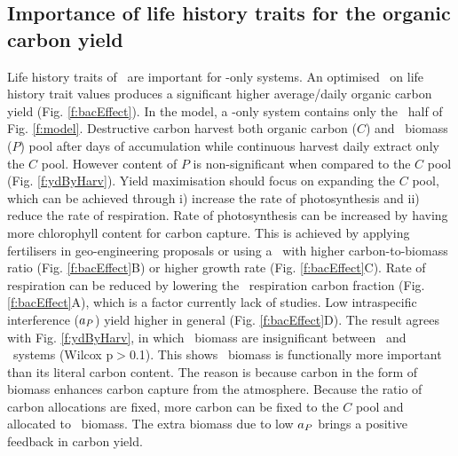 \documentclass[../thesis.tex]{subfiles} %
\begin{document}
\subsection{Importance of life history traits for the organic carbon yield}
Life history traits of \phy\ are important for \phy-only systems. An optimised \phy\ on life history trait values produces a significant higher average/daily organic carbon yield (Fig. \ref{f:bacEffect}).  In the model, a \phy-only system contains only the \phy\ half of Fig. \ref{f:model}.  Destructive carbon harvest both organic carbon ($C$) and \phy\ biomass ($P$) pool after days of accumulation while continuous harvest daily extract only the $C$ pool.  However content of $P$ is non-significant when compared to the $C$ pool (Fig. \ref{f:ydByHarv}).  Yield maximisation should focus on expanding the $C$ pool, which can be achieved through \Rn{1}) increase the rate of photosynthesis and \Rn{2}) reduce the rate of respiration.  Rate of photosynthesis can be increased by having more chlorophyll content for carbon capture.  This is achieved by applying fertilisers in geo-engineering proposals \autocite{gnanadesikan2008export,lawrence2014efficiency,trick2010iron,kwiatkowski2015atmospheric,lovelock2007ocean} or using a \phy\ with higher carbon-to-biomass ratio (Fig. \ref{f:bacEffect}B) or higher growth rate (Fig. \ref{f:bacEffect}C).  Rate of respiration can be reduced by lowering the \phy\ respiration carbon fraction (Fig. \ref{f:bacEffect}A), which is a factor currently lack of studies.  Low intraspecific interference ($a_P$) yield higher in general (Fig. \ref{f:bacEffect}D).  The result agrees with Fig. \ref{f:ydByHarv}, in which \phy\ biomass are insignificant between \PoH\ and \PoN\ systems (Wilcox p$>$0.1).  This shows \phy\ biomass is functionally more important than its literal carbon content.  The reason is because carbon in the form of biomass enhances carbon capture from the atmosphere.  Because the ratio of carbon allocations are fixed, more carbon can be fixed to the $C$ pool and allocated to \phy\ biomass.  The extra biomass due to low $a_P$ brings a positive feedback in carbon yield.

\end{document}
